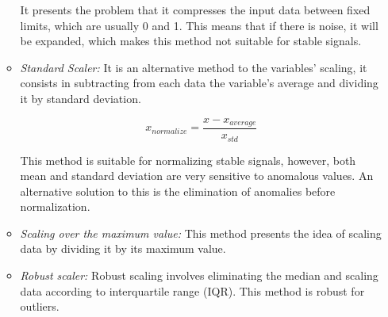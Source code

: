 \begin{itemize}
\begin{itemize}
It presents the problem that it compresses the input data between fixed limits, which are usually 0 and 1. This means that if there is noise, it will be expanded, which makes this method not suitable for stable signals.

\item \textit{Standard Scaler:} It is an alternative method to the variables' scaling, it consists in subtracting from each data the variable's average and dividing it by standard deviation.

\begin{equation}
x_{normalize} = \frac{x - x_{average}}{x_{std}}
\end{equation}

This method is suitable for normalizing stable signals, however, both mean and standard deviation are very sensitive to anomalous values. An alternative solution to this is the elimination of anomalies before normalization.

\item \textit{Scaling over the maximum value:} This method presents the idea of scaling data by dividing it by its maximum value.

\item \textit{Robust scaler:} Robust scaling involves eliminating the median and scaling data according to interquartile range (IQR). This method is robust for outliers.

\end{itemize}

\end{itemize}

